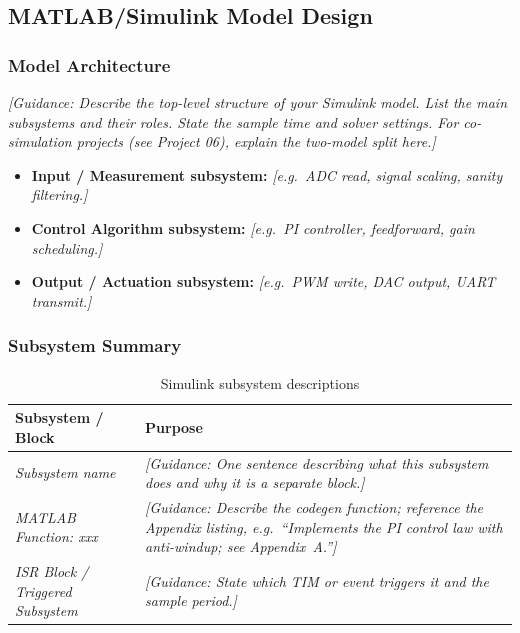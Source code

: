
\subsection{MATLAB/Simulink Model Design}

\subsubsection{Model Architecture}

\textit{[Guidance: Describe the top-level structure of your Simulink
model. List the main subsystems and their roles. State the sample
time and solver settings. For co-simulation projects (see Project 06),
explain the two-model split here.]}

\begin{itemize}
    \item \textbf{Input / Measurement subsystem:}
          \textit{[e.g.\ ADC read, signal scaling, sanity filtering.]}
    \item \textbf{Control Algorithm subsystem:}
          \textit{[e.g.\ PI controller, feedforward, gain scheduling.]}
    \item \textbf{Output / Actuation subsystem:}
          \textit{[e.g.\ PWM write, DAC output, UART transmit.]}
\end{itemize}

\subsubsection{Subsystem Summary}

\begin{table}[H]
    \centering
    \caption{Simulink subsystem descriptions}
    \label{tab:subsystems}
    \begin{tabularx}{\textwidth}{|l|X|}
        \hline
        \textbf{Subsystem / Block} & \textbf{Purpose} \\
        \hline
        \textit{Subsystem name} &
            \textit{[Guidance: One sentence describing what this
            subsystem does and why it is a separate block.]} \\
        \hline
        \textit{MATLAB Function: xxx} &
            \textit{[Guidance: Describe the codegen function; reference
            the Appendix listing, e.g.\ ``Implements the PI control
            law with anti-windup; see Appendix~A.'']} \\
        \hline
        \textit{ISR Block / Triggered Subsystem} &
            \textit{[Guidance: State which TIM or event triggers it
            and the sample period.]} \\
        \hline
    \end{tabularx}
\end{table}

